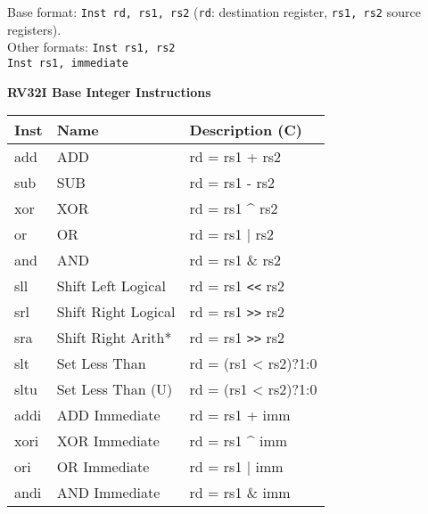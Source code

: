 \begin{tabbing}
    Base format: \quad \= \texttt{Inst rd, rs1, rs2} (\texttt{rd}: destination register, \texttt{rs1, rs2} source registers).\\
    Other formats: \> \texttt{Inst rs1, rs2}\\
    \> \texttt{Inst rs1, immediate}
\end{tabbing}
\begin{multicols}{2}
\textbf{RV32I Base Integer Instructions}\\

        \begin{tabular}
        {| T | l | l |} \hline
        \rm Inst & Name                    & \rm Description (C)          \\ \hline
        add      & ADD                     & rd = rs1 + rs2               \\
        sub      & SUB                     & rd = rs1 - rs2               \\
        xor      & XOR                     & rd = rs1 \^{} rs2            \\
        or       & OR                      & rd = rs1 | rs2               \\
        and      & AND                     & rd = rs1 \& rs2              \\
        sll      & Shift Left Logical      & rd = rs1 \verb|<<| rs2       \\
        srl      & Shift Right Logical     & rd = rs1 \verb|>>| rs2       \\
        sra      & Shift Right Arith*      & rd = rs1 \verb|>>| rs2       \\
        slt      & Set Less Than           & rd = (rs1 < rs2)?1:0         \\
        sltu     & Set Less Than (U)       & rd = (rs1 < rs2)?1:0         \\ \hline
        addi     & ADD Immediate           & rd = rs1 + imm               \\
        xori     & XOR Immediate           & rd = rs1 \^{} imm            \\
        ori      & OR Immediate            & rd = rs1 | imm               \\
        andi     & AND Immediate           & rd = rs1 \& imm              \\

\end{tabular}
\end{multicols}
